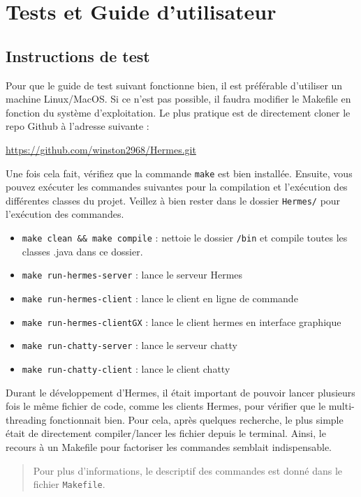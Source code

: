 \documentclass{article}
\begin{document}
\section{Tests et Guide d'utilisateur}

\subsection{Instructions de test}

Pour que le guide de test suivant fonctionne bien, il est préférable d'utiliser un machine Linux/MacOS. 
Si ce n'est pas possible, il faudra modifier le Makefile en fonction du système d'exploitation.
Le plus pratique est de directement cloner le repo Github à l'adresse suivante :
\begin{center}
    \href{https://github.com/winston2968/Hermes.git}{https://github.com/winston2968/Hermes.git}
\end{center}

Une fois cela fait, vérifiez que la commande \texttt{make} est bien installée. Ensuite, vous pouvez exécuter les commandes 
suivantes pour la compilation et l'exécution des différentes classes du projet. Veillez à bien rester dans le dossier \texttt{Hermes/}
pour l'exécution des commandes. 
\begin{itemize}
    \item \texttt{make clean \&\& make compile} : nettoie le dossier \texttt{/bin} et compile toutes les classes .java dans ce dossier. 
    \item \texttt{make run-hermes-server} : lance le serveur Hermes 
    \item \texttt{make run-hermes-client} : lance le client en ligne de commande 
    \item \texttt{make run-hermes-clientGX} : lance le client hermes en interface graphique 
    \item \texttt{make run-chatty-server} : lance le serveur chatty 
    \item \texttt{make run-chatty-client} : lance le client chatty 
\end{itemize}

Durant le développement d'Hermes, il était important de pouvoir lancer plusieurs fois le même fichier de code, 
comme les clients Hermes, pour vérifier que le multi-threading fonctionnait bien. Pour cela, après quelques recherche,
le plus simple était de directement compiler/lancer les fichier depuis le terminal. Ainsi, le recours à un Makefile pour 
factoriser les commandes semblait indispensable. 

\begin{quote}
    Pour plus d'informations, le descriptif des commandes est donné dans le fichier \texttt{Makefile}.
\end{quote}
\end{document}
